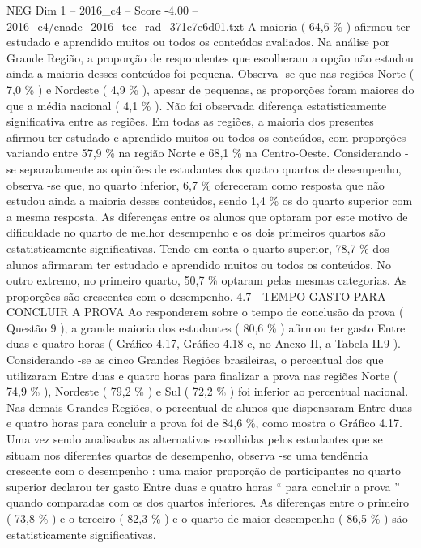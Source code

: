 \begin{textsample}{NEG Dim 1 – 2016\_c4 – Score -4.00 – 2016\_c4/enade\_2016\_tec\_rad\_371c7e6d01.txt}
A maioria ( 64,6 \% ) afirmou ter estudado e aprendido muitos ou todos os conteúdos avaliados.
Na análise por Grande Região, a proporção de respondentes que escolheram a opção não estudou ainda a maioria desses conteúdos foi pequena.
Observa -se que nas regiões Norte ( 7,0 \% ) e Nordeste ( 4,9 \% ), apesar de pequenas, as proporções foram maiores do que a média nacional ( 4,1 \% ).
Não foi observada diferença estatisticamente significativa entre as regiões.
Em todas as regiões, a maioria dos presentes afirmou ter estudado e aprendido muitos ou todos os conteúdos, com proporções variando entre 57,9 \% na região Norte e 68,1 \% na Centro-Oeste.
Considerando -se separadamente as opiniões de estudantes dos quatro quartos de desempenho, observa -se que, no quarto inferior, 6,7 \% ofereceram como resposta que não estudou ainda a maioria desses conteúdos, sendo 1,4 \% os do quarto superior com a mesma resposta.
As diferenças entre os alunos que optaram por este motivo de dificuldade no quarto de melhor desempenho e os dois primeiros quartos são estatisticamente significativas.
Tendo em conta o quarto superior, 78,7 \% dos alunos afirmaram ter estudado e aprendido muitos ou todos os conteúdos.
No outro extremo, no primeiro quarto, 50,7 \% optaram pelas mesmas categorias.
As proporções são crescentes com o desempenho. 4.7 - TEMPO GASTO PARA CONCLUIR A PROVA Ao responderem sobre o tempo de conclusão da prova ( Questão 9 ), a grande maioria dos estudantes ( 80,6 \% ) afirmou ter gasto Entre duas e quatro horas ( Gráfico 4.17, Gráfico 4.18 e, no Anexo II, a Tabela II.9 ).
Considerando -se as cinco Grandes Regiões brasileiras, o percentual dos que utilizaram Entre duas e quatro horas para finalizar a prova nas regiões Norte ( 74,9 \% ), Nordeste ( 79,2 \% ) e Sul ( 72,2 \% ) foi inferior ao percentual nacional.
Nas demais Grandes Regiões, o percentual de alunos que dispensaram Entre duas e quatro horas para concluir a prova foi de 84,6 \%, como mostra o Gráfico 4.17.
Uma vez sendo analisadas as alternativas escolhidas pelos estudantes que se situam nos diferentes quartos de desempenho, observa -se uma tendência crescente com o desempenho : uma maior proporção de participantes no quarto superior declarou ter gasto Entre duas e quatro horas “ para concluir a prova ” quando comparadas com os dos quartos inferiores.
As diferenças entre o primeiro ( 73,8 \% ) e o terceiro ( 82,3 \% ) e o quarto de maior desempenho ( 86,5 \% ) são estatisticamente significativas.

\end{textsample}
